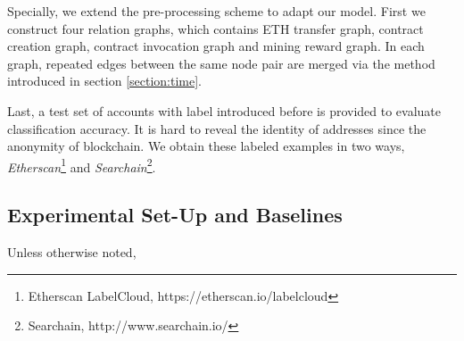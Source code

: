 Specially, we extend the pre-processing scheme to adapt our model. First we construct four relation graphs, which contains ETH transfer graph, contract creation graph, contract invocation graph and mining reward graph. In each graph, repeated edges between the same node pair are merged via the method introduced in section \ref{section:time}.

Last, a test set of accounts with label introduced before is provided to evaluate classification accuracy. It is hard to reveal the identity of addresses since the anonymity of blockchain. We obtain these labeled examples in two ways, \emph{Etherscan}\footnote{Etherscan LabelCloud, https://etherscan.io/labelcloud} and \emph{Searchain}\footnote{Searchain, http://www.searchain.io/}.




\subsection{Experimental Set-Up and Baselines}
Unless otherwise noted,

